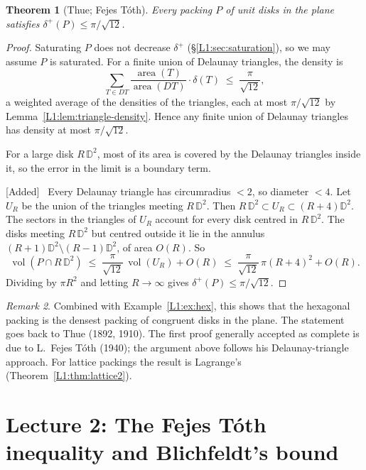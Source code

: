 \documentclass[11pt,openany]{book}
\theoremstyle{plain}
\newtheorem{theorem}{Theorem}[chapter]
\theoremstyle{definition}
\theoremstyle{remark}
\newtheorem{remark}[theorem]{Remark}
\newcommand{\added}[1]{{\color{addcol}#1}}
\newcommand{\orig}[1]{\marginpar{\raggedright\scriptsize\color{gray}#1}}
\newenvironment{addedblock}{\par\color{addcol}\noindent\textsf{\small[Added]}\ }{\par}
\newcommand{\vol}{\operatorname{vol}}
\newcommand{\dens}{\delta}             %
\begin{document}
\begin{theorem}[\added{Thue; Fejes T\'oth}]
\label{L1:thm:thue}
Every packing $P$ of unit disks in the plane satisfies $\dens^+(P)\le\pi/\sqrt{12}$.
\end{theorem}

\begin{proof}
\added{Saturating $P$ does not decrease $\dens^+$ (\S\ref{L1:sec:saturation}), so we may assume $P$ is saturated.}
For a finite union of Delaunay triangles, the density is
\[
  \sum_{T\in DT}\frac{\operatorname{area}(T)}{\operatorname{area}(DT)}\cdot\dens(T)
  \;\le\;\frac{\pi}{\sqrt{12}},
\]
a weighted average of the densities of the triangles, each at most $\pi/\sqrt{12}$
by Lemma~\ref{L1:lem:triangle-density}. Hence any finite union of Delaunay triangles has density
at most $\pi/\sqrt{12}$.

For a large disk $R\,\mathbb{D}^2$, most of its area is covered by the Delaunay triangles inside it,
so the error in the limit is a boundary term.
\begin{addedblock}
Every Delaunay triangle has circumradius $<2$, so diameter $<4$. Let $U_R$ be the union of the
triangles meeting $R\,\mathbb{D}^2$. Then $R\,\mathbb{D}^2\subset U_R\subset(R+4)\mathbb{D}^2$. The sectors
in the triangles of $U_R$ account for every disk centred in $R\,\mathbb{D}^2$. The disks meeting
$R\,\mathbb{D}^2$ but centred outside it lie in the annulus $(R+1)\mathbb{D}^2\setminus(R-1)\mathbb{D}^2$, of area $O(R)$. So
\[
  \vol(P\cap R\,\mathbb{D}^2)\;\le\;\frac{\pi}{\sqrt{12}}\,\vol(U_R)+O(R)
  \;\le\;\frac{\pi}{\sqrt{12}}\,\pi(R+4)^2+O(R).
\]
Dividing by $\pi R^2$ and letting $R\to\infty$ gives $\dens^+(P)\le\pi/\sqrt{12}$.
\end{addedblock}
\end{proof}
\orig{p.\,16 sketch: large concentric disks}

\begin{remark}
\added{Combined with Example~\ref{L1:ex:hex}, this shows that the hexagonal packing is the
densest packing of congruent disks in the plane. The statement goes back to Thue (1892, 1910).
The first proof generally accepted as complete is due to L.~Fejes T\'oth (1940); the argument above
follows his Delaunay-triangle approach. For lattice packings the result is Lagrange's
(Theorem~\ref{L1:thm:lattice2}).}
\end{remark}
\chapter{Lecture 2: The Fejes T\'oth inequality and Blichfeldt's bound}\label{L2:chap}
\end{document}
